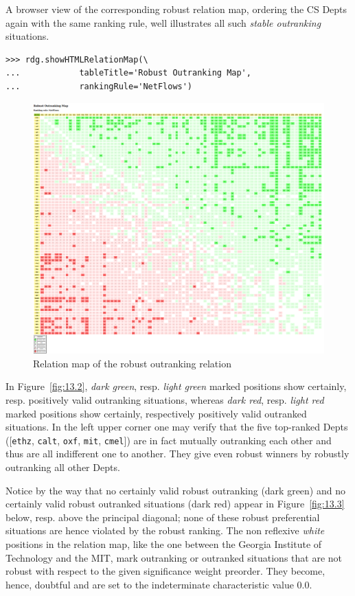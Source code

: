 A browser view of the corresponding robust relation map, ordering the CS Depts again with the same \NetFlows ranking rule, well illustrates all such \emph{stable outranking} situations.
\begin{lstlisting}
>>> rdg.showHTMLRelationMap(\
...            tableTitle='Robust Outranking Map',
...            rankingRule='NetFlows')
\end{lstlisting}
\begin{figure}[ht]
\includegraphics[width=\hsize]{Figures/13-2-the_cs_RelationMap.png}
\caption{Relation map of the robust outranking relation}
\label{fig:13.2}       %
\end{figure}

In Figure~\vref{fig:13.2}, \emph{dark green}, resp. \emph{light green} marked positions show certainly, resp. positively valid outranking situations, whereas \emph{dark red}, resp. \emph{light red} marked positions show certainly, respectively positively valid outranked situations. In the left upper corner one may verify that the five top-ranked Depts ([\texttt{ethz}, \texttt{calt}, \texttt{oxf}, \texttt{mit}, \texttt{cmel}]) are in fact mutually outranking each other and thus are all indifferent one to another. They give even robust \Condorcet winners by robustly outranking all other Depts.

Notice by the way that no certainly valid robust outranking (dark green) and no certainly valid robust outranked situations (dark red) appear in Figure~\vref{fig:13.3} below, resp. above the principal diagonal; none of these robust preferential situations are hence violated by the robust \NetFlows ranking. The non reflexive \emph{white} positions in the relation map, like the one between the Georgia Institute of Technology and the MIT, mark outranking or outranked situations that are not robust with respect to the given significance weight preorder. They become, hence, doubtful and are set to the indeterminate characteristic value $0.0$.

